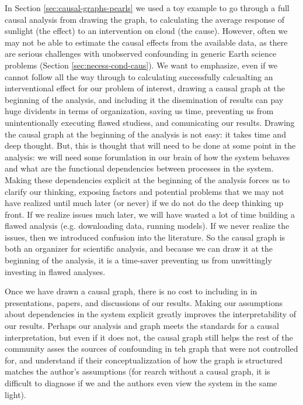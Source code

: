 \documentclass[12pt]{article}
\begin{document}
In Section \ref{sec:causal-graphs-pearls} we used a toy example to go
through a full causal analysis from drawing the graph, to calculating
the average response of sunlight (the effect) to an intervention on
cloud (the cause). However, often we may not be able to estimate the
causal effects from the available data, as there are serious
challenges with unobserved confounding in generic Earth science
problems (Section \ref{sec:necess-cond-caus}). We want to emphasize,
even if we cannot follow all the way through to calculating
successfully calcualting an interventional effect for our problem of
interest, drawing a causal graph at the beginning of the analysis, and
including it the disemination of results can pay huge dividents in
terms of organization, saving us time, preventing us from
unintentionally executing flawed studiess, and comunicating our
results. Drawing the causal graph at the beginning of the analysis is
not easy: it takes time and deep thought. But, this is thought that
will need to be done at some point in the analysis: we will need some
forumlation in our brain of how the system behaves and what are the
functional dependencies between processes in the system. Making these
dependencies explicit at the beginning of the analysis forces us to
clarify our thinking, exposing factors and potential problems that we
may not have realized until much later (or never) if we do not do the
deep thinking up front. If we realize issues much later, we will have
wasted a lot of time building a flawed analysis (e.g. downloading
data, running models). If we never realize the issues, then we
introduced confusion into the literature. So the causal graph is both
an organizer for scientific analysis, and because we can draw it at
the beginning of the analysis, it is a time-saver preventing us from
unwittingly investing in flawed analyses.

Once we have drawn a causal graph, there is no cost to including in in
presentations, papers, and discussions of our results. Making our
assumptions about dependencies in the system explicit greatly improves
the interpretability of our results. Perhaps our analysis and graph
meets the standards for a causal interpretation, but even if it does
not, the causal graph still helps the rest of the community asses the
sources of confounding in teh graph that were not controlled for, and
understand if their conceptualizzation of how the graph is structured
matches the author's assumptions (for rearch without a causal graph,
it is difficult to diagnose if we and the authors even view the system
in the same light).
\end{document}

